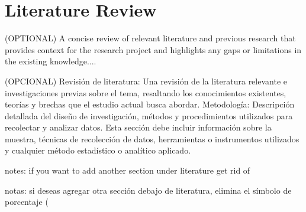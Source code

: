 \section{Literature Review}
(OPTIONAL) A concise review of relevant literature and previous research that provides context for the research project and highlights any gaps or limitations in the existing knowledge.... 

(OPCIONAL) Revisión de literatura: Una revisión de la literatura relevante e investigaciones previas sobre el tema, resaltando los conocimientos existentes, teorías y brechas que el estudio actual busca abordar.
Metodología: Descripción detallada del diseño de investigación, métodos y procedimientos utilizados para recolectar y analizar datos. Esta sección debe incluir información sobre la muestra, técnicas de recolección de datos, herramientas o instrumentos utilizados y cualquier método estadístico o analítico aplicado.

notes: if you want to add another section under literature get rid of %

notas: si deseas agregar otra sección debajo de literatura, elimina el símbolo de porcentaje (%
